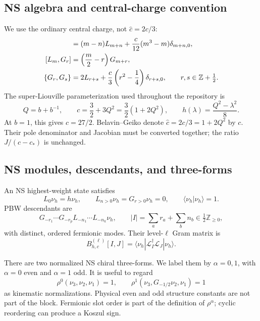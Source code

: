 \documentclass[11pt]{article}
\newcommand{\half}{\tfrac12}
\begin{document}
\subsection{NS algebra and central-charge convention}

We use the ordinary central charge, not
\(\widehat c=2c/3\):
\begin{align}
 [L_m,L_n]
 &=(m-n)L_{m+n}
   +\frac{c}{12}(m^3-m)\delta_{m+n,0},
 \notag\\
 [L_m,G_r]
 &=\left(\frac m2-r\right)G_{m+r},
 \notag\\
 \{G_r,G_s\}
 &=2L_{r+s}
   +\frac c3\left(r^2-\frac14\right)\delta_{r+s,0},
 \qquad r,s\in\mathbb Z+\half.
 \label{eq:ns-algebra}
\end{align}
The super-Liouville parameterization used throughout the repository is
\begin{equation}
 Q=b+b^{-1},
 \qquad
 c=\frac32+3Q^2=\frac32(1+2Q^2),
 \qquad
 h(\lambda)=\frac{Q^2-\lambda^2}{8}.
 \label{eq:parameterization}
\end{equation}
At \(b=1\), this gives \(c=27/2\).  Belavin--Geiko denote
\(\widehat c=2c/3=1+2Q^2\) by \(c\).  Their pole denominator and Jacobian
must be converted together; the ratio \(J/(c-c_*)\) is unchanged.

\subsection{NS modules, descendants, and three-forms}

An NS highest-weight state satisfies
\begin{equation}
 L_0\nu_h=h\nu_h,
 \qquad
 L_{n>0}\nu_h=G_{r>0}\nu_h=0,
 \qquad
 \langle\nu_h|\nu_h\rangle=1.
 \label{eq:highest-weight}
\end{equation}
PBW descendants are
\begin{equation}
 G_{-r_1}\cdots G_{-r_p}
 L_{-n_1}\cdots L_{-n_k}\nu_h,
 \qquad
 |I|=\sum_a r_a+\sum_b n_b
 \in\half\mathbb Z_{\ge0},
 \label{eq:pbw-descendants}
\end{equation}
with distinct, ordered fermionic modes.  Their level-\(\ell\) Gram matrix is
\begin{equation}
 B_{h,c}^{(\ell)}[I,J]
 =\langle\nu_h|\mathcal L_I^\dagger\mathcal L_J|\nu_h\rangle.
 \label{eq:gram-definition}
\end{equation}

There are two normalized NS chiral three-forms.  We label them by
\(\alpha=0,1\), with \(\alpha=0\) even and \(\alpha=1\) odd.  It is useful
to regard
\begin{equation}
 \rho^0(\nu_3,\nu_2,\nu_1)=1,
 \qquad
 \rho^1(\nu_3,G_{-1/2}\nu_2,\nu_1)=1
 \label{eq:three-form-normalization}
\end{equation}
as kinematic normalizations.  Physical even and odd structure constants are
not part of the block.  Fermionic slot order is part of the definition of
\(\rho^\alpha\); cyclic reordering can produce a Koszul sign.
\end{document}
